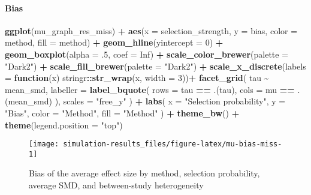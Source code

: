 \documentclass[
]{article}
\newenvironment{Shaded}{\begin{snugshade}}{\end{snugshade}}
\newcommand{\AttributeTok}[1]{\textcolor[rgb]{0.13,0.29,0.53}{#1}}
\newcommand{\ConstantTok}[1]{\textcolor[rgb]{0.56,0.35,0.01}{#1}}
\newcommand{\ControlFlowTok}[1]{\textcolor[rgb]{0.13,0.29,0.53}{\textbf{#1}}}
\newcommand{\DecValTok}[1]{\textcolor[rgb]{0.00,0.00,0.81}{#1}}
\newcommand{\FunctionTok}[1]{\textcolor[rgb]{0.13,0.29,0.53}{\textbf{#1}}}
\newcommand{\NormalTok}[1]{#1}
\newcommand{\SpecialCharTok}[1]{\textcolor[rgb]{0.81,0.36,0.00}{\textbf{#1}}}
\newcommand{\StringTok}[1]{\textcolor[rgb]{0.31,0.60,0.02}{#1}}
\begin{document}
\paragraph{Bias}\label{bias-1}

\begin{Shaded}
\begin{Highlighting}[]
\FunctionTok{ggplot}\NormalTok{(mu\_graph\_res\_miss) }\SpecialCharTok{+} 
  \FunctionTok{aes}\NormalTok{(}\AttributeTok{x =}\NormalTok{ selection\_strength, }\AttributeTok{y =}\NormalTok{ bias, }\AttributeTok{color =}\NormalTok{ method, }\AttributeTok{fill =}\NormalTok{ method) }\SpecialCharTok{+}
  \FunctionTok{geom\_hline}\NormalTok{(}\AttributeTok{yintercept =} \DecValTok{0}\NormalTok{) }\SpecialCharTok{+}
  \FunctionTok{geom\_boxplot}\NormalTok{(}\AttributeTok{alpha =}\NormalTok{ .}\DecValTok{5}\NormalTok{, }\AttributeTok{coef =} \ConstantTok{Inf}\NormalTok{) }\SpecialCharTok{+}
  \FunctionTok{scale\_color\_brewer}\NormalTok{(}\AttributeTok{palette =} \StringTok{"Dark2"}\NormalTok{) }\SpecialCharTok{+}
  \FunctionTok{scale\_fill\_brewer}\NormalTok{(}\AttributeTok{palette =} \StringTok{"Dark2"}\NormalTok{) }\SpecialCharTok{+}
  \FunctionTok{scale\_x\_discrete}\NormalTok{(}\AttributeTok{labels =} \ControlFlowTok{function}\NormalTok{(x) stringr}\SpecialCharTok{::}\FunctionTok{str\_wrap}\NormalTok{(x, }\AttributeTok{width =} \DecValTok{3}\NormalTok{))}\SpecialCharTok{+}
  \FunctionTok{facet\_grid}\NormalTok{(}
\NormalTok{    tau }\SpecialCharTok{\textasciitilde{}}\NormalTok{ mean\_smd, }
    \AttributeTok{labeller =} \FunctionTok{label\_bquote}\NormalTok{(}
      \AttributeTok{rows =}\NormalTok{ tau }\SpecialCharTok{==}\NormalTok{ .(tau),}
      \AttributeTok{cols =}\NormalTok{ mu }\SpecialCharTok{==}\NormalTok{ .(mean\_smd)}
\NormalTok{    ),}
    \AttributeTok{scales =} \StringTok{"free\_y"}
\NormalTok{  ) }\SpecialCharTok{+}
  \FunctionTok{labs}\NormalTok{(}
    \AttributeTok{x =} \StringTok{"Selection probability"}\NormalTok{, }
    \AttributeTok{y =} \StringTok{"Bias"}\NormalTok{, }
    \AttributeTok{color =} \StringTok{"Method"}\NormalTok{,}
    \AttributeTok{fill =} \StringTok{"Method"}
\NormalTok{  ) }\SpecialCharTok{+} 
  \FunctionTok{theme\_bw}\NormalTok{() }\SpecialCharTok{+}
  \FunctionTok{theme}\NormalTok{(}\AttributeTok{legend.position =} \StringTok{"top"}\NormalTok{)}
\end{Highlighting}
\end{Shaded}

\begin{sidewaysfigure}
\texttt{[image: simulation-results\_files/figure-latex/mu-bias-miss-1]} \caption{Bias of the average effect size by method, selection probability, average SMD, and between-study heterogeneity}\label{fig:mu-bias-miss}
\end{sidewaysfigure}
\end{document}
